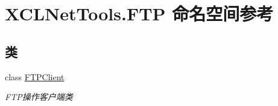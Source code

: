 \hypertarget{namespace_x_c_l_net_tools_1_1_f_t_p}{}\section{X\+C\+L\+Net\+Tools.\+F\+TP 命名空间参考}
\label{namespace_x_c_l_net_tools_1_1_f_t_p}
\subsection*{类}
\begin{DoxyCompactItemize}
\item 
class \hyperlink{class_x_c_l_net_tools_1_1_f_t_p_1_1_f_t_p_client}{F\+T\+P\+Client}
\begin{DoxyCompactList}\small\item\em F\+T\+P操作客户端类 \end{DoxyCompactList}\end{DoxyCompactItemize}
